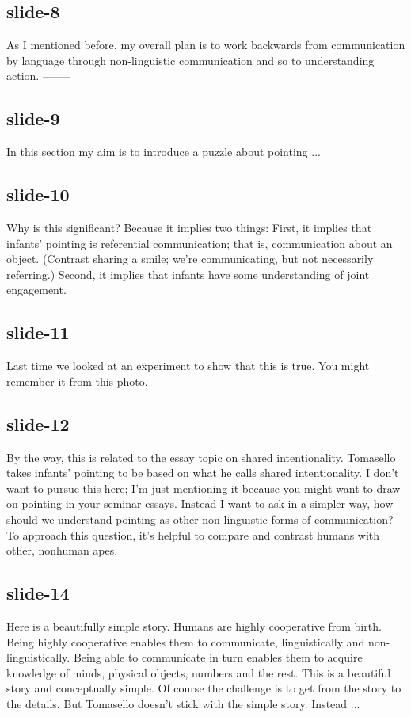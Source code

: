 \documentclass[12pt,\papersize]{extarticle}
\begin{document}
 
\subsection{slide-8}
As I mentioned before, my overall plan is to work backwards from communication by language through non-linguistic communication and so to understanding action.
--------
 
 
\subsection{slide-9}
In this section my aim is to introduce a puzzle about pointing ...
 
 
\subsection{slide-10}
Why is this significant?
Because it implies two things:
First, it implies that infants' pointing is referential communication; that is, communication about an object.
(Contrast sharing a smile; we're communicating, but not necessarily referring.)
Second, it implies that infants have some understanding of joint engagement.
 
 
\subsection{slide-11}
Last time we looked at an experiment to show that this is true. You might remember it from this photo.
 
 
\subsection{slide-12}
By the way, this is related to the essay topic on shared intentionality.
Tomasello takes infants' pointing to be based on what he calls shared intentionality.
I don't want to pursue this here; I'm just mentioning it because you might want to draw on pointing in your seminar essays.
Instead I want to ask in a simpler way, how should we understand pointing as other non-linguistic forms of communication?
To approach this question, it's helpful to compare and contrast humans with other, nonhuman apes.
 
 
\subsection{slide-14}
Here is a beautifully simple story. Humans are highly cooperative from birth. Being highly cooperative enables them to communicate, linguistically and non-linguistically. Being able to communicate in turn enables them to acquire knowledge of minds, physical objects, numbers and the rest. This is a beautiful story and conceptually simple. Of course the challenge is to get from the story to the details.
But Tomasello doesn't stick with the simple story. Instead ...
 
\end{document}
